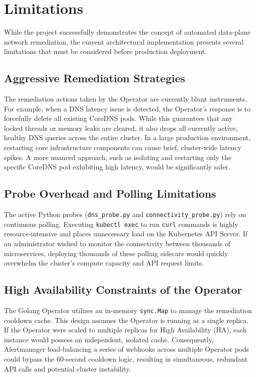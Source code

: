 \documentclass[12pt,a4paper]{article}
\begin{document}
\newpage

\section{Limitations}
\onehalfspacing
While the project successfully demonstrates the concept of automated data-plane network remediation, the current architectural implementation presents several limitations that must be considered before production deployment.

\subsection{Aggressive Remediation Strategies}
The remediation actions taken by the Operator are currently blunt instruments. For example, when a DNS latency issue is detected, the Operator's response is to forcefully delete all existing CoreDNS pods. While this guarantees that any locked threads or memory leaks are cleared, it also drops all currently active, healthy DNS queries across the entire cluster. In a large production environment, restarting core infrastructure components can cause brief, cluster-wide latency spikes. A more nuanced approach, such as isolating and restarting only the specific CoreDNS pod exhibiting high latency, would be significantly safer.

\subsection{Probe Overhead and Polling Limitations}
The active Python probes (\texttt{dns\_probe.py} and \texttt{connectivity\_probe.py}) rely on continuous polling. Executing \texttt{kubectl exec} to run \texttt{curl} commands is highly resource-intensive and places unnecessary load on the Kubernetes API Server. If an administrator wished to monitor the connectivity between thousands of microservices, deploying thousands of these polling sidecars would quickly overwhelm the cluster's compute capacity and API request limits.

\subsection{High Availability Constraints of the Operator}
The Golang Operator utilizes an in-memory \texttt{sync.Map} to manage the remediation cooldown cache. This design assumes the Operator is running as a single replica. If the Operator were scaled to multiple replicas for High Availability (HA), each instance would possess an independent, isolated cache. Consequently, Alertmanager load-balancing a series of webhooks across multiple Operator pods could bypass the 60-second cooldown logic, resulting in simultaneous, redundant API calls and potential cluster instability.
\end{document}
